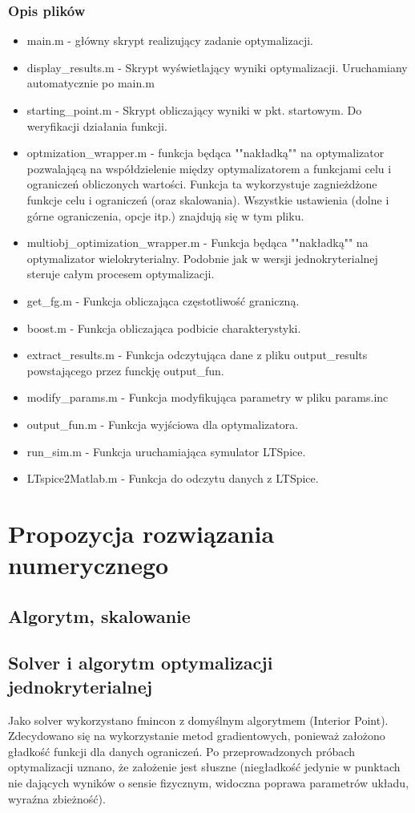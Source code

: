 \documentclass{article}
\begin{document}
\subsubsection*{Opis plików}
\begin{itemize}
	\item main.m - główny skrypt realizujący zadanie optymalizacji.
	\item display\_results.m - Skrypt wyświetlający wyniki optymalizacji. Uruchamiany automatycznie po main.m
	\item starting\_point.m - Skrypt obliczający wyniki w pkt. startowym. Do weryfikacji działania funkcji.
	\item optmization\_wrapper.m - funkcja będąca ""nakładką"" na optymalizator pozwalającą na współdzielenie między optymalizatorem a funkcjami celu i ograniczeń
obliczonych wartości. Funkcja ta wykorzystuje zagnieżdżone funkcje celu i ograniczeń (oraz skalowania). Wszystkie ustawienia (dolne i górne ograniczenia, opcje itp.) znajdują się w tym pliku.
	\item multiobj\_optimization\_wrapper.m - Funkcja będąca ""nakładką"" na optymalizator wielokryterialny. Podobnie jak w wersji jednokryterialnej steruje całym procesem optymalizacji.
	\item get\_fg.m - Funkcja obliczająca częstotliwość graniczną.
	\item boost.m - Funkcja obliczająca podbicie charakterystyki.
	\item extract\_results.m - Funkcja odczytująca dane z pliku output\_results powstającego przez funckję output\_fun.
	\item modify\_params.m - Funkcja modyfikująca parametry w pliku params.inc
	\item output\_fun.m - Funkcja wyjściowa dla optymalizatora.
	\item run\_sim.m - Funkcja uruchamiająca symulator LTSpice.
	\item LTspice2Matlab.m - Funkcja do odczytu danych z LTSpice.
\end{itemize}

\section{Propozycja rozwiązania numerycznego}
\subsection{Algorytm, skalowanie}
\subsection*{Solver i algorytm optymalizacji jednokryterialnej}
Jako solver wykorzystano fmincon z domyślnym algorytmem (Interior Point). Zdecydowano się na wykorzystanie
metod gradientowych, ponieważ założono gładkość funkcji dla danych ograniczeń. Po przeprowadzonych próbach optymalizacji uznano, że założenie jest słuszne (niegładkość jedynie w punktach nie dających wyników o sensie fizycznym, widoczna poprawa parametrów układu, wyraźna zbieżność).
\end{document}

